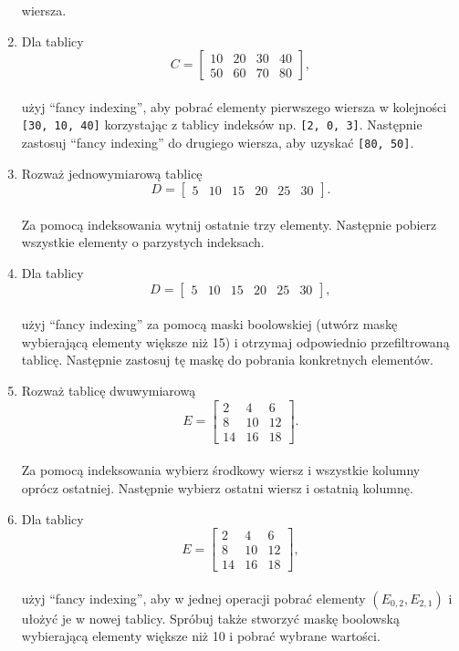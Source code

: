 \documentclass[
  letterpaper,
  DIV=11,
  numbers=noendperiod]{scrreprt}
\begin{document}
\begin{enumerate}
  wiersza.
\item
  Dla tablicy\\
  \[C = \begin{bmatrix}10 & 20 & 30 & 40 \\ 50 & 60 & 70 & 80\end{bmatrix},\]\\
  użyj ``fancy indexing'', aby pobrać elementy pierwszego wiersza w
  kolejności \texttt{{[}30,\ 10,\ 40{]}} korzystając z tablicy indeksów
  np. \texttt{{[}2,\ 0,\ 3{]}}. Następnie zastosuj ``fancy indexing'' do
  drugiego wiersza, aby uzyskać \texttt{{[}80,\ 50{]}}.
\item
  Rozważ jednowymiarową tablicę\\
  \[D = \begin{bmatrix}5 & 10 & 15 & 20 & 25 & 30\end{bmatrix}.\]\\
  Za pomocą indeksowania wytnij ostatnie trzy elementy. Następnie
  pobierz wszystkie elementy o parzystych indeksach.
\item
  Dla tablicy\\
  \[D = \begin{bmatrix}5 & 10 & 15 & 20 & 25 & 30\end{bmatrix},\]\\
  użyj ``fancy indexing'' za pomocą maski boolowskiej (utwórz maskę
  wybierającą elementy większe niż 15) i otrzymaj odpowiednio
  przefiltrowaną tablicę. Następnie zastosuj tę maskę do pobrania
  konkretnych elementów.
\item
  Rozważ tablicę dwuwymiarową\\
  \[E = \begin{bmatrix}2 & 4 & 6 \\ 8 & 10 & 12 \\ 14 & 16 & 18\end{bmatrix}.\]\\
  Za pomocą indeksowania wybierz środkowy wiersz i wszystkie kolumny
  oprócz ostatniej. Następnie wybierz ostatni wiersz i ostatnią kolumnę.
\item
  Dla tablicy\\
  \[E = \begin{bmatrix}2 & 4 & 6 \\ 8 & 10 & 12 \\ 14 & 16 & 18\end{bmatrix},\]\\
  użyj ``fancy indexing'', aby w jednej operacji pobrać elementy
  \((E_{0,2}, E_{2,1})\) i ułożyć je w nowej tablicy. Spróbuj także
  stworzyć maskę boolowską wybierającą elementy większe niż 10 i pobrać
  wybrane wartości.
\end{enumerate}
\end{document}
